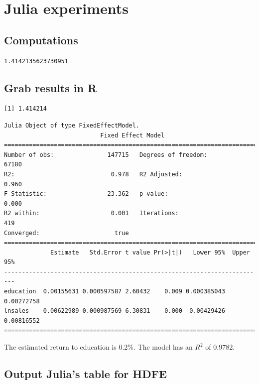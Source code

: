 \documentclass[
  12pt,
]{article}
\begin{document}
\hypertarget{julia-experiments}{%
\section{Julia experiments}\label{julia-experiments}}

\hypertarget{computations}{%
\subsection{Computations}\label{computations}}

\begin{verbatim}
1.4142135623730951
\end{verbatim}

\hypertarget{grab-results-in-r}{%
\subsection{Grab results in R}\label{grab-results-in-r}}

\begin{verbatim}
[1] 1.414214
\end{verbatim}

\begin{verbatim}
Julia Object of type FixedEffectModel.
                           Fixed Effect Model                           
=========================================================================
Number of obs:               147715   Degrees of freedom:           67180
R2:                           0.978   R2 Adjusted:                  0.960
F Statistic:                 23.362   p-value:                      0.000
R2 within:                    0.001   Iterations:                     419
Converged:                     true   
=========================================================================
             Estimate   Std.Error t value Pr(>|t|)   Lower 95%  Upper 95%
-------------------------------------------------------------------------
education  0.00155631 0.000597587 2.60432    0.009 0.000385043 0.00272758
lnsales    0.00622989 0.000987569 6.30831    0.000  0.00429426 0.00816552
=========================================================================
\end{verbatim}

\vspace{0.3cm}

The estimated return to education is 0.2\%. The model has an \(R^2\) of 0.9782.

\hypertarget{output-julias-table-for-hdfe}{%
\subsection{Output Julia's table for HDFE}\label{output-julias-table-for-hdfe}}
\end{document}
